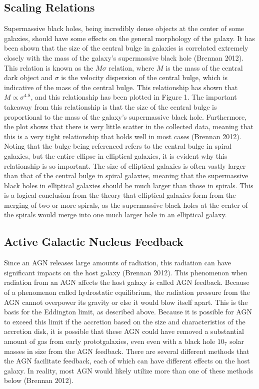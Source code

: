 \documentclass[12pt]{article}
\begin{document}
\subsection{Scaling Relations}
Supermassive black holes, being incredibly dense objects at the center of some
galaxies, should have some effects on the general morphology of the galaxy. It
has been shown that the size of the central bulge in galaxies is correlated
extremely closely with the mass of the galaxy's supermassive black hole (Brennan
2012).  This
relation is known as the $M \sigma$ relation, where $M$ is the mass of the
central dark object and $\sigma$ is the velocity dispersion of the central
bulge, which is indicative of the mass of the central bulge.  This relationship
has shown that $M \propto \sigma^{4.8}$, and this
relationship has been plotted in Figure 1.  The important takeaway from this
relationship is that the size of the central bulge is proportional to the mass
of the galaxy's supermassive black hole.  Furthermore, the plot shows that there
is very little scatter in the collected data, meaning that this is a very tight
relationship that holds well in most cases (Brennan 2012).  Noting that the bulge
being
referenced refers to the central bulge in spiral galaxies, but the entire
ellipse in elliptical galaxies, it is evident why this relationship is so
important.  The size of elliptical galaxies is often vastly larger than that of
the central bulge in spiral galaxies, meaning that the supermassive black holes
in elliptical galaxies should be much larger than those in spirals.  This is a
logical conclusion from the theory that elliptical galaxies form from the
merging of two or more spirals, as the supermassive black holes at the center of
the spirals would merge into one much larger hole in an elliptical galaxy.

\subsection{Active Galactic Nucleus Feedback}
Since an AGN releases large amounts of radiation, this radiation can have
significant impacts on the host galaxy (Brennan 2012).  This phenomenon when
radiation from an
AGN affects the host galaxy is called AGN feedback.  Because of a phenomenon
called
hydrostatic equilibrium, the radiation pressure from the AGN cannot overpower
its gravity or else it would blow itself apart. This is the basis for the
Eddington limit, as described above.  Because it is possible for AGN to exceed
this limit if the accretion based on the size and characteristics of the
accretion disk, it is possible that these AGN could have removed a substantial
amount of gas from early prototgalaxies, even even with a black hole $10_7$
solar masses in size from the AGN feedback.  There are several different methods
that the AGN facilitate feedback, each of which can have different effects on
the host galaxy.  In reality, most AGN would likely utilize more than one of
these methods below (Brennan 2012).
\end{document}
